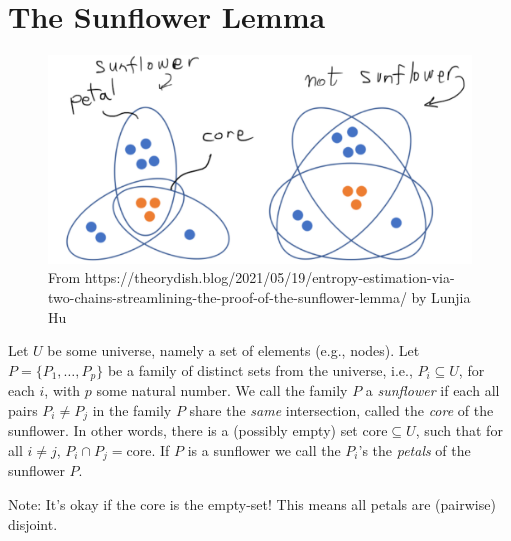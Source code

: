 \section{The Sunflower Lemma}

\begin{figure}
    \centering
        \includegraphics[width=0.75\linewidth]{images/sunflower-lemma.png}
    \caption{From https://theorydish.blog/2021/05/19/entropy-estimation-via-two-chains-streamlining-the-proof-of-the-sunflower-lemma/ by Lunjia Hu}
    \label{fig:enter-label}
\end{figure}




\begin{svgraybox}
\begin{definition}[Sunflower] Let $U$ be some universe, namely a set of elements (e.g., nodes). Let $P=\{P_1,\dots,P_p\}$ be a family of distinct sets from the universe, i.e., $P_i\subseteq U$, for each $i$, with $p$ some natural number. 
We call the family $P$ a \emph{sunflower} if each all pairs $P_i \neq P_j$ in the family $P$ share the \emph{same} intersection, called the \emph{core} of the sunflower.
In other words, there is a (possibly empty) set $\mathrm{core}\subseteq U$, such that for all $i\neq j$,  $ P_i\cap P_j = \mathrm{core}$.
If $P$ is a sunflower we call the $P_i$'s the \emph{petals} of the sunflower $P$.
\end{definition}
\end{svgraybox}
Note: It's okay if the core is the empty-set! This means all petals are (pairwise) disjoint.


